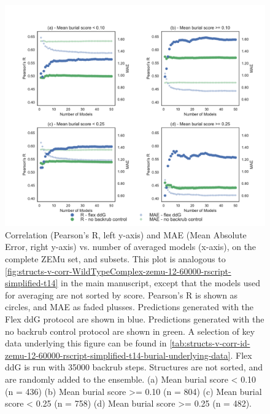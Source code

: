 \begin{figure}
  \includegraphics[width=\textwidth,keepaspectratio]{structs-v-corr-id-zemu-12-60000-rscript-simplified-t14-burial.pdf}
  \caption[]{
    Correlation (Pearson's R, left y-axis) and MAE (Mean Absolute Error, right y-axis) vs. number of averaged models (x-axis), on the complete ZEMu set, and subsets. This plot is analogous to \cref{fig:structs-v-corr-WildTypeComplex-zemu-12-60000-rscript-simplified-t14} in the main manuscript, except that the models used for averaging are not sorted by score.
    Pearson's R is shown as circles, and MAE as faded plusses.
Predictions generated with the Flex ddG protocol are shown in blue.
Predictions generated with the no backrub control protocol are shown in green.
    A selection of key data underlying this figure can be found in \cref{tab:structs-v-corr-id-zemu-12-60000-rscript-simplified-t14-burial-underlying-data}. Flex ddG is run with 35000 backrub steps.
    Structures are not sorted, and are randomly added to the ensemble. 
    (a) Mean burial score < 0.10 (n = 436)
    (b) Mean burial score >= 0.10 (n = 804)
    (c) Mean burial score < 0.25 (n = 758)
    (d) Mean burial score >= 0.25 (n = 482).
  } \label{fig:structs-v-corr-id-zemu-12-60000-rscript-simplified-t14-burial}
\end{figure}
